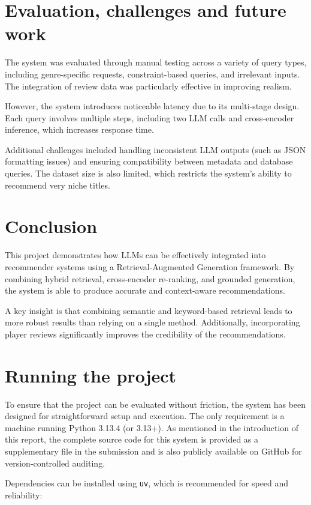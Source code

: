 \section{Evaluation, challenges and future work}
The system was evaluated through manual testing across a variety of query types, including genre-specific requests, constraint-based queries, and irrelevant inputs. The integration of review data was particularly effective in improving realism.

However, the system introduces noticeable latency due to its multi-stage design. Each query involves multiple steps, including two LLM calls and cross-encoder inference, which increases response time.

Additional challenges included handling inconsistent LLM outputs (such as JSON formatting issues) and ensuring compatibility between metadata and database queries. The dataset size is also limited, which restricts the system’s ability to recommend very niche titles.

\section{Conclusion}
This project demonstrates how LLMs can be effectively integrated into recommender systems using a Retrieval-Augmented Generation framework. By combining hybrid retrieval, cross-encoder re-ranking, and grounded generation, the system is able to produce accurate and context-aware recommendations.

A key insight is that combining semantic and keyword-based retrieval leads to more robust results than relying on a single method. Additionally, incorporating player reviews significantly improves the credibility of the recommendations.

\section{Running the project}
To ensure that the project can be evaluated without friction, the system has been designed for straightforward setup and execution. The only requirement is a machine running Python 3.13.4 (or 3.13+). As mentioned in the introduction of this report, the complete source code for this system is provided as a supplementary file in the submission and is also publicly available on GitHub for version-controlled auditing.

Dependencies can be installed using \texttt{uv}, which is recommended for speed and reliability:

